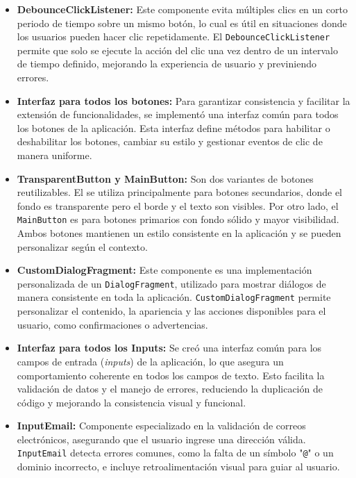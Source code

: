 \begin{itemize}
    \item \textbf{DebounceClickListener:} Este componente evita múltiples clics en un corto periodo de tiempo sobre un mismo botón, lo cual es útil en situaciones donde los usuarios pueden hacer clic repetidamente. El \texttt{DebounceClickListener} permite que solo se ejecute la acción del clic una vez dentro de un intervalo de tiempo definido, mejorando la experiencia de usuario y previniendo errores.

    \item \textbf{Interfaz para todos los botones:} Para garantizar consistencia y facilitar la extensión de funcionalidades, se implementó una interfaz común para todos los botones de la aplicación. Esta interfaz define métodos para habilitar o deshabilitar los botones, cambiar su estilo y gestionar eventos de clic de manera uniforme.

    \item \textbf{TransparentButton y MainButton:} Son dos variantes de botones reutilizables. El \texttt{} se utiliza principalmente para botones secundarios, donde el fondo es transparente pero el borde y el texto son visibles. Por otro lado, el \texttt{MainButton} es para botones primarios con fondo sólido y mayor visibilidad. Ambos botones mantienen un estilo consistente en la aplicación y se pueden personalizar según el contexto.


    \item \textbf{CustomDialogFragment:} Este componente es una implementación personalizada de un \texttt{DialogFragment}, utilizado para mostrar diálogos de manera consistente en toda la aplicación. \texttt{CustomDialogFragment} permite personalizar el contenido, la apariencia y las acciones disponibles para el usuario, como confirmaciones o advertencias.

    \item \textbf{Interfaz para todos los Inputs:} Se creó una interfaz común para los campos de entrada (\textit{inputs}) de la aplicación, lo que asegura un comportamiento coherente en todos los campos de texto. Esto facilita la validación de datos y el manejo de errores, reduciendo la duplicación de código y mejorando la consistencia visual y funcional.

    \item \textbf{InputEmail:} Componente especializado en la validación de correos electrónicos, asegurando que el usuario ingrese una dirección válida. \texttt{InputEmail} detecta errores comunes, como la falta de un símbolo "\texttt{@}" o un dominio incorrecto, e incluye retroalimentación visual para guiar al usuario.


\end{itemize}
